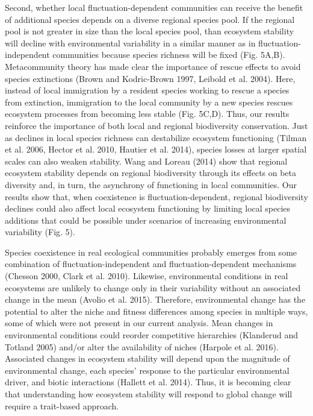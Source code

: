 \documentclass[12pt,]{article}
\begin{document}
Second, whether local fluctuation-dependent communities can receive the
benefit of additional species depends on a diverse regional species
pool. If the regional pool is not greater in size than the local species
pool, than ecosystem stability will decline with environmental
variability in a similar manner as in fluctuation-independent
communities because species richness will be fixed (Fig. 5A,B).
Metacommunity theory has made clear the importance of rescue effects to
avoid species extinctions (Brown and Kodric-Brown 1997, Leibold et al.
2004). Here, instead of local immigration by a resident species working
to rescue a species from extinction, immigration to the local community
by a new species rescues ecosystem processes from becoming less stable
(Fig. 5C,D). Thus, our results reinforce the importance of both local
and regional biodiversity conservation. Just as declines in local
species richness can destabilize ecosystem functioning (Tilman et al.
2006, Hector et al. 2010, Hautier et al. 2014), species losses at larger
spatial scales can also weaken stability. Wang and Loreau (2014) show
that regional ecosystem stability depends on regional biodiversity
through its effects on beta diversity and, in turn, the asynchrony of
functioning in local communities. Our results show that, when
coexistence is fluctuation-dependent, regional biodiversity declines
could also affect local ecosystem functioning by limiting local species
additions that could be possible under scenarios of increasing
environmental variability (Fig. 5).

Species coexistence in real ecological communities probably emerges from
some combination of fluctuation-independent and fluctuation-dependent
mechanisms (Chesson 2000, Clark et al. 2010). Likewise, environmental
conditions in real ecosystems are unlikely to change only in their
variability without an associated change in the mean (Avolio et al.
2015). Therefore, environmental change has the potential to alter the
niche and fitness differences among species in multiple ways, some of
which were not present in our current analysis. Mean changes in
environmental conditions could reorder competitive hierarchies
(Klanderud and Totland 2005) and/or alter the availability of niches
(Harpole et al. 2016). Associated changes in ecosystem stability will
depend upon the magnitude of environmental change, each species'
response to the particular environmental driver, and biotic interactions
(Hallett et al. 2014). Thus, it is becoming clear that understanding how
ecosystem stability will respond to global change will require a
trait-based approach.
\end{document}
